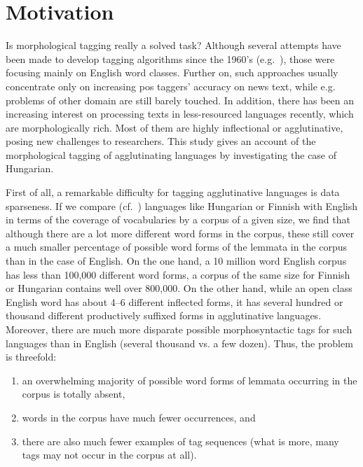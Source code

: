 \section{Motivation}

Is morphological tagging really a solved task? 
Although several attempts have been made to develop tagging algorithms since the 1960’s (e.g.~\cite{Stolz1965,Klein1963}), those were focusing mainly on English word classes. 
Further on, such approaches usually concentrate only on increasing \gls{pos} taggers’ accuracy on news text, while e.g. problems of other domain are still barely touched. 
In addition, there has been an increasing interest on processing texts in less-resourced languages recently, which are morphologically rich. 
Most of them are highly inflectional or agglutinative, posing new challenges to researchers. This study gives an account of the morphological tagging of agglutinating languages by investigating the case of Hungarian. 

First of all, a remarkable difficulty for tagging agglutinative languages is data sparseness. If we compare (cf.~\cite{Oravecz2002a}) languages like Hungarian or Finnish with English in terms of the coverage of vocabularies by a corpus of a given size, we find that although there are a lot more different word forms in the corpus, these still cover a much smaller percentage of possible word forms of the lemmata in the corpus than in the case of English. 
On the one hand, a 10 million word English corpus has less than 100,000 different word forms, a corpus of the same size for Finnish or Hungarian contains well over 800,000. On the other hand, while an open class English word has about 4--6 different inflected forms, it has several hundred or thousand different productively suffixed forms in agglutinative languages. Moreover, there are much more disparate possible morphosyntactic tags for such languages than in English (several thousand vs. a few dozen). 
Thus, the problem is threefold:
\begin{enumerate}
  \item an overwhelming majority of possible word forms of lemmata occurring in the corpus is totally absent,
  \item words in the corpus have much fewer occurrences, and
  \item there are also much fewer examples of tag sequences (what is more, many tags may not occur in the corpus at all).
\end{enumerate}

